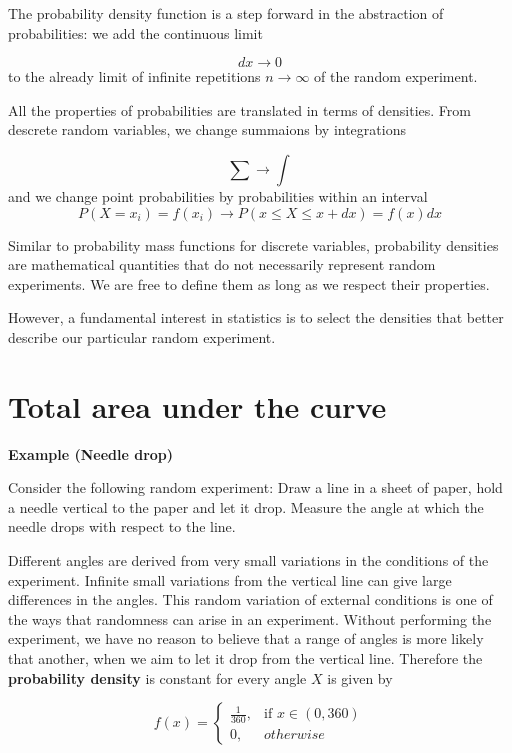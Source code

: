 \documentclass[
]{book}
\begin{document}
The probability density function is a step forward in the abstraction of probabilities: we add the continuous limit

\[dx \rightarrow 0\]
to the already limit of infinite repetitions \(n \rightarrow \infty\) of the random experiment.

All the properties of probabilities are translated in terms of densities. From descrete random variables, we change summaions by integrations

\[\sum \rightarrow \int\]
and we change point probabilities by probabilities within an interval \[P(X=x_i)=f(x_i) \rightarrow P(x\leq X \leq x+dx)= f(x)dx\]

Similar to probability mass functions for discrete variables, probability densities are mathematical quantities that do not necessarily represent random experiments. We are free to define them as long as we respect their properties.

However, a fundamental interest in statistics is to select the densities that better describe our particular random experiment.

\hypertarget{total-area-under-the-curve}{%
\section{Total area under the curve}\label{total-area-under-the-curve}}

\textbf{Example (Needle drop)}

Consider the following random experiment: Draw a line in a sheet of paper, hold a needle vertical to the paper and let it drop. Measure the angle at which the needle drops with respect to the line.

Different angles are derived from very small variations in the conditions of the experiment. Infinite small variations from the vertical line can give large differences in the angles. This random variation of external conditions is one of the ways that randomness can arise in an experiment. Without performing the experiment, we have no reason to believe that a range of angles is more likely that another, when we aim to let it drop from the vertical line. Therefore the \textbf{probability density} is constant for every angle \(X\) is given by

\[
    f(x)= 
\begin{cases}
    \frac{1}{360},& \text{if } x\in (0,360)\\
    0,& otherwise 
\end{cases}
\]
\end{document}
